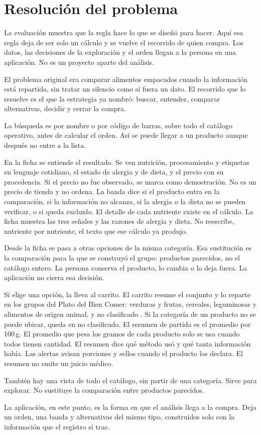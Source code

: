 \section{Resolución del problema}

La evaluación muestra que la regla hace lo que se diseñó para hacer. Aquí esa regla deja de ser solo un cálculo y se vuelve el recorrido de quien compra. Los datos, las decisiones de la exploración y el orden llegan a la persona en una aplicación. No es un proyecto aparte del análisis.

El problema original era comparar alimentos empacados cuando la información está repartida, sin tratar un silencio como si fuera un dato. El recorrido que lo resuelve es el que la estrategia ya nombró: buscar, entender, comparar alternativas, decidir y cerrar la compra.

La búsqueda es por nombre o por código de barras, sobre todo el catálogo operativo, antes de calcular el orden. Así se puede llegar a un producto aunque después no entre a la lista.

En la ficha se entiende el resultado. Se ven nutrición, procesamiento y etiquetas en lenguaje cotidiano, el estado de alergia y de dieta, y el precio con su procedencia. Si el precio no fue observado, se marca como demostración. No es un precio de tienda y no ordena. La banda dice si el producto entra en la comparación, si la información no alcanza, si la alergia o la dieta no se pueden verificar, o si queda excluido. El detalle de cada nutriente existe en el cálculo. La ficha muestra las tres señales y las razones de alergia y dieta. No reescribe, nutriente por nutriente, el texto que ese cálculo ya produjo.

Desde la ficha se pasa a otras opciones de la misma categoría. Esa sustitución es la comparación para la que se construyó el grupo: productos parecidos, no el catálogo entero. La persona conserva el producto, lo cambia o lo deja fuera. La aplicación no cierra esa decisión.

Si elige una opción, la lleva al carrito. El carrito resume el conjunto y lo reparte en los grupos del Plato del Bien Comer: verduras y frutas, cereales, leguminosas y alimentos de origen animal, y no clasificado \citep{nom0432013}. Si la categoría de un producto no se puede ubicar, queda en no clasificado. El resumen de partida es el promedio por 100\,g. El promedio que pesa los gramos de cada producto solo se usa cuando todos tienen cantidad. El resumen dice qué método usó y qué tanta información había. Las alertas avisan porciones y sellos cuando el producto los declara. El resumen no emite un juicio médico.

También hay una vista de todo el catálogo, sin partir de una categoría. Sirve para explorar. No sustituye la comparación entre productos parecidos.

La aplicación, en este punto, es la forma en que el análisis llega a la compra. Deja un orden, una banda y alternativas del mismo tipo, construidos solo con la información que el registro sí trae.
